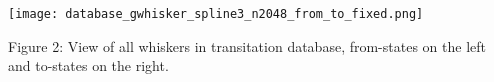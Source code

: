 
\centering\texttt{[image: database\_gwhisker\_spline3\_n2048\_from\_to\_fixed.png]}
\begin{center}
\label{fig:database}
 Figure 2: View of all whiskers in transitation database, 
 from-states on the left and to-states on the right.
\end{center}




